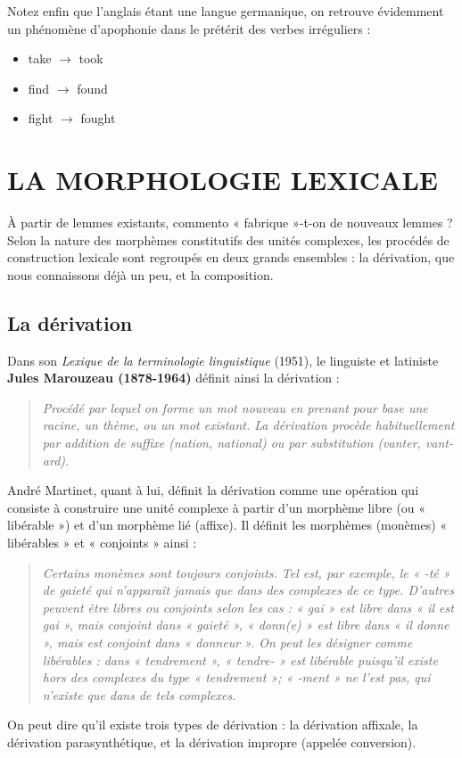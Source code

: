 Notez enfin que l’anglais étant une langue germanique, on retrouve évidemment un phénomène d’apophonie dans le prétérit des verbes irréguliers :
\begin{itemize}
\item take $\rightarrow$ took
\item find $\rightarrow$ found
\item fight $\rightarrow$ fought
\end{itemize}

\section{LA MORPHOLOGIE LEXICALE}
À partir de lemmes existants, commento « fabrique »-t-on de nouveaux lemmes ? Selon la nature des morphèmes constitutifs des unités complexes, les procédés de construction lexicale sont regroupés en deux grands ensembles : la dérivation, que nous connaissons déjà un peu, et la composition.

\subsection{La dérivation}
Dans son \textit{Lexique de la terminologie linguistique} (1951), le linguiste et latiniste \textbf{Jules Marouzeau (1878-1964)} définit ainsi la dérivation :
\begin{quote}\small\itshape
Procédé par lequel on forme un mot nouveau en prenant pour base une racine, un thème, ou un mot existant. La dérivation procède habituellement par addition de suffixe (nation, national) ou par substitution (vanter, vant-ard).
\end{quote}
André Martinet, quant à lui, définit la dérivation comme une opération qui consiste à construire une unité complexe à partir d’un morphème libre (ou « libérable ») et d’un morphème lié (affixe). Il définit les morphèmes (monèmes) « libérables » et « conjoints » ainsi :
\begin{quote}\small\itshape
Certains monèmes sont toujours conjoints. Tel est, par exemple, le « -té » de gaieté qui n’apparaît jamais que dans des complexes de ce type. D’autres peuvent être libres ou conjoints selon les cas : « gai » est libre dans « il est gai », mais conjoint dans « gaieté », « donn(e) » est libre dans « il donne », mais est conjoint dans « donneur ». On peut les désigner comme libérables : dans « tendrement », « tendre- » est libérable puisqu’il existe hors des complexes du type « tendrement »; « -ment » ne l’est pas, qui n’existe que dans de tels complexes.
\end{quote}
On peut dire qu’il existe trois types de dérivation : la dérivation affixale, la dérivation parasynthétique, et la dérivation impropre (appelée conversion).

